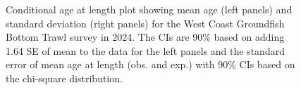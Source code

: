 \documentclass[
]{scrartcl}
\begin{document}
\begin{figure}[H]


\caption{\label{fig-call-plot-wcgbts6}Conditional age at length plot
showing mean age (left panels) and standard deviation (right panels) for
the West Coast Groundfish Bottom Trawl survey in 2024. The CIs are 90\%
based on adding 1.64 SE of mean to the data for the left panels and the
standard error of mean age at length (obs. and exp.) with 90\% CIs based
on the chi-square distribution.}

\end{figure}%
\end{document}
